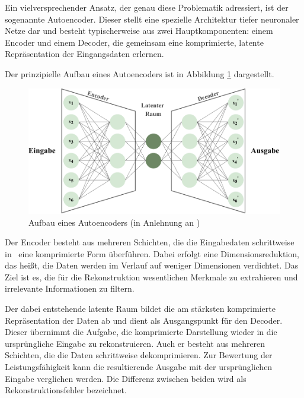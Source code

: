 Ein vielversprechender Ansatz, der genau diese Problematik adressiert, ist der sogenannte Autoencoder. 
Dieser stellt eine spezielle Architektur tiefer neuronaler Netze dar und besteht typischerweise aus zwei Hauptkomponenten: einem Encoder und einem Decoder, die gemeinsam eine komprimierte, latente Repräsentation der Eingangsdaten erlernen.
\cite{Lempitsky2019}

Der prinzipielle Aufbau eines Autoencoders ist in Abbildung \ref{fig:Autoencoder} dargestellt.

\begin{figure}[htbp]
    \centering
    \includegraphics[width=1\textwidth]{Bilder/Autoencoder/AutoencoderModell.pdf}
    \caption[Aufbau eines Autoencoders]{Aufbau eines Autoencoders (in Anlehnung an \cite{AutoencoderBild})}
    \label{fig:Autoencoder}
\end{figure}

\vspace{-0.75em}
Der Encoder besteht aus mehreren Schichten, die die Eingabedaten schrittweise in%
\pagebreak
~eine komprimierte Form überführen. 
Dabei erfolgt eine Dimensionsreduktion, das heißt, die Daten werden im Verlauf auf weniger Dimensionen verdichtet. 
Das Ziel ist es, die für die Rekonstruktion wesentlichen Merkmale zu extrahieren und irrelevante Informationen zu filtern.

Der dabei entstehende latente Raum bildet die am stärksten komprimierte Repräsentation der Daten ab und dient als Ausgangspunkt für den Decoder.
Dieser übernimmt die Aufgabe, die komprimierte Darstellung wieder in die ursprüngliche Eingabe zu rekonstruieren. 
Auch er besteht aus mehreren Schichten, die die Daten schrittweise dekomprimieren.
Zur Bewertung der Leistungsfähigkeit kann die resultierende Ausgabe mit der ursprünglichen Eingabe verglichen werden. 
Die Differenz zwischen beiden wird als Rekonstruktionsfehler bezeichnet. \cite{Autoencoder}

